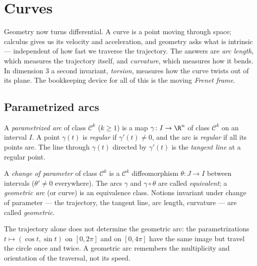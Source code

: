 \chapter{Curves}\label{ch:b2:curves}

Geometry now turns differential. A curve is a point moving through
space; calculus gives us its velocity and acceleration, and geometry
asks what is intrinsic --- independent of how fast we traverse the
trajectory. The answers are \emph{arc length}, which measures the
trajectory itself, and \emph{curvature}, which measures how it
bends. In dimension $3$ a second invariant, \emph{torsion},
measures how the curve twists out of its plane. The bookkeeping
device for all of this is the moving \emph{Frenet frame}.

\section{Parametrized arcs}

\begin{definition}\label{def:b2:curves:arc}
A \emph{parametrized arc} of class $\mathcal{C}^k$ ($k \geq 1$) is
a map $\gamma \colon I \to \R^n$ of class $\mathcal{C}^k$ on an
interval $I$. A point $\gamma(t)$ is \emph{regular} if
$\gamma'(t) \neq 0$, and the arc is \emph{regular} if all its
points are. The line through $\gamma(t)$ directed by $\gamma'(t)$
is the \emph{tangent line} at a regular point.
\end{definition}

\begin{definition}\label{def:b2:curves:reparam}
A \emph{change of parameter} of class $\mathcal{C}^k$ is a
$\mathcal{C}^k$ diffeomorphism $\theta \colon J \to I$ between
intervals ($\theta' \neq 0$ everywhere). The arcs $\gamma$ and
$\gamma \circ \theta$ are called \emph{equivalent}; a
\emph{geometric arc} (or curve) is an equivalence class. Notions
invariant under change of parameter --- the trajectory, the tangent
line, arc length, curvature --- are called \emph{geometric}.
\end{definition}

\begin{remark}
The trajectory alone does not determine the geometric arc: the
parametrizations $t \mapsto (\cos t, \sin t)$ on $[0, 2\pi]$ and on
$[0, 4\pi]$ have the same image but travel the circle once and
twice. A geometric arc remembers the multiplicity and orientation
of the traversal, not its speed.
\end{remark}

